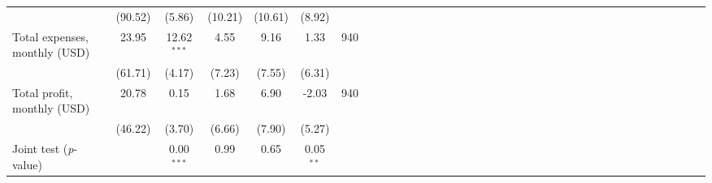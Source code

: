 {\begin{tabular}{l*{6}{SSSSSc}}
          &  (90.52)&   (5.86)&  (10.21)&  (10.61)&   (8.92)&         \\
Total expenses, monthly (USD)&    23.95&12.62$^{***}$&     4.55&     9.16&     1.33&      940\\
          &  (61.71)&   (4.17)&   (7.23)&   (7.55)&   (6.31)&         \\
Total profit, monthly (USD)&    20.78&     0.15&     1.68&     6.90&    -2.03&      940\\
          &  (46.22)&   (3.70)&   (6.66)&   (7.90)&   (5.27)&         \\
\midrule Joint test (\emph{p}-value)&         &0.00$^{***}$&     0.99&     0.65&0.05$^{**}$&         \\
\bottomrule
\end{tabular}
}
